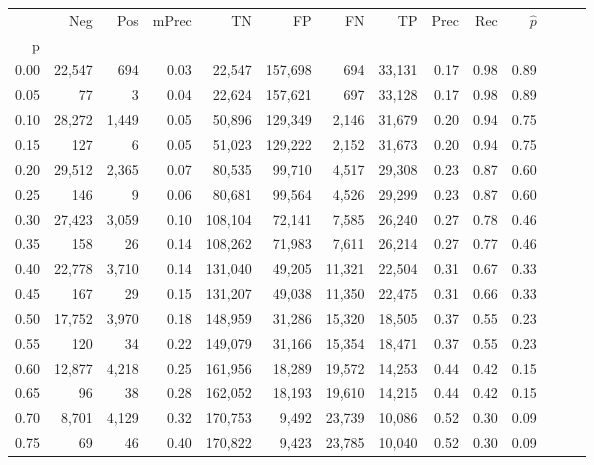 \begin{tabular}{rrrrrrrrrrrrrr}
\toprule
{} &     Neg &    Pos & mPrec &       TN &       FP &      FN &      TP &  Prec &   Rec & $\hat{p}$ \\
p    &         &        &       &          &          &         &         &       &       &           \\
\midrule
0.00 &  22,547 &    694 &  0.03 &   22,547 &  157,698 &     694 &  33,131 &  0.17 &  0.98 &      0.89 \\
0.05 &      77 &      3 &  0.04 &   22,624 &  157,621 &     697 &  33,128 &  0.17 &  0.98 &      0.89 \\
0.10 &  28,272 &  1,449 &  0.05 &   50,896 &  129,349 &   2,146 &  31,679 &  0.20 &  0.94 &      0.75 \\
0.15 &     127 &      6 &  0.05 &   51,023 &  129,222 &   2,152 &  31,673 &  0.20 &  0.94 &      0.75 \\
0.20 &  29,512 &  2,365 &  0.07 &   80,535 &   99,710 &   4,517 &  29,308 &  0.23 &  0.87 &      0.60 \\
0.25 &     146 &      9 &  0.06 &   80,681 &   99,564 &   4,526 &  29,299 &  0.23 &  0.87 &      0.60 \\
0.30 &  27,423 &  3,059 &  0.10 &  108,104 &   72,141 &   7,585 &  26,240 &  0.27 &  0.78 &      0.46 \\
0.35 &     158 &     26 &  0.14 &  108,262 &   71,983 &   7,611 &  26,214 &  0.27 &  0.77 &      0.46 \\
0.40 &  22,778 &  3,710 &  0.14 &  131,040 &   49,205 &  11,321 &  22,504 &  0.31 &  0.67 &      0.33 \\
0.45 &     167 &     29 &  0.15 &  131,207 &   49,038 &  11,350 &  22,475 &  0.31 &  0.66 &      0.33 \\
0.50 &  17,752 &  3,970 &  0.18 &  148,959 &   31,286 &  15,320 &  18,505 &  0.37 &  0.55 &      0.23 \\
0.55 &     120 &     34 &  0.22 &  149,079 &   31,166 &  15,354 &  18,471 &  0.37 &  0.55 &      0.23 \\
0.60 &  12,877 &  4,218 &  0.25 &  161,956 &   18,289 &  19,572 &  14,253 &  0.44 &  0.42 &      0.15 \\
0.65 &      96 &     38 &  0.28 &  162,052 &   18,193 &  19,610 &  14,215 &  0.44 &  0.42 &      0.15 \\
0.70 &   8,701 &  4,129 &  0.32 &  170,753 &    9,492 &  23,739 &  10,086 &  0.52 &  0.30 &      0.09 \\
0.75 &      69 &     46 &  0.40 &  170,822 &    9,423 &  23,785 &  10,040 &  0.52 &  0.30 &      0.09 \\

\end{tabular}
